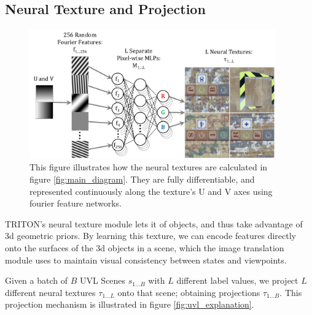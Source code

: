 \documentclass{article}
\begin{document}
\subsection{Neural Texture and Projection}

	\begin{figure}[H]
		\begin{center}
			\includegraphics[width=300pt]{../images/learnable_textures.pdf}
		\end{center}
		\caption{
			This figure illustrates how the neural textures are calculated in figure \ref{fig:main_diagram}. They are fully differentiable, and represented continuously along the texture's U and V axes using fourier feature networks.
		}
		\label{fig:learnable_textures}
	\end{figure}

	TRITON's neural texture module lets it  of objects, and thus take advantage of 3d geometric priors. By learning this texture, we can encode features directly onto the surfaces of the 3d objects in a scene, which the image translation module uses to maintain visual consistency between states and viewpoints.

	Given a batch of $B$ UVL Scenes $s_{1\dots B}$ with $L$ different label values, we project $L$ different neural textures $\tau_{1\dots L}$ onto that scene; obtaining projections $\tau_{1\dots B}$. This projection mechanism is illustrated in figure \ref{fig:uvl_explanation}.
\end{document}
